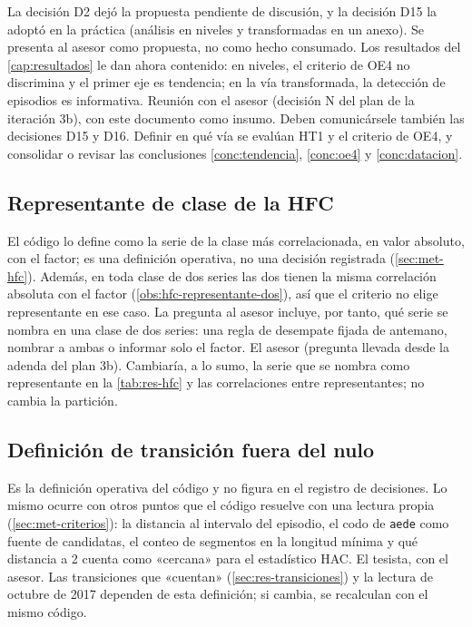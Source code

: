 {La decisión D2 dejó la propuesta pendiente de discusión, y la decisión D15 la adoptó en la
práctica (análisis en niveles y transformadas en un anexo). Se presenta al asesor como propuesta,
no como hecho consumado. Los resultados del \cref{cap:resultados} le dan ahora contenido: en niveles,
el criterio de OE4 no discrimina y el primer eje es tendencia; en la vía transformada, la detección
de episodios es informativa.}
{Reunión con el asesor (decisión N del plan de la iteración 3b), con este documento como insumo.
Deben comunicársele también las decisiones D15 y D16.}
{Definir en qué vía se evalúan HT1 y el criterio de OE4, y consolidar o revisar las conclusiones
\ref{conc:tendencia}, \ref{conc:oe4} y \ref{conc:datacion}.}

\subsection{Representante de clase de la HFC}
\label{sec:pend-representante}

{El código lo define como la serie de la clase más correlacionada, en valor absoluto, con el
factor; es una definición operativa, no una decisión registrada (\cref{sec:met-hfc}). Además,
en toda clase de dos series las dos tienen la misma correlación absoluta con el factor
(\cref{obs:hfc-representante-dos}), así que el criterio no elige representante en ese caso. La
pregunta al asesor incluye, por tanto, qué serie se nombra en una clase de dos series: una regla
de desempate fijada de antemano, nombrar a ambas o informar solo el factor.}
{El asesor (pregunta llevada desde la adenda del plan 3b).}
{Cambiaría, a lo sumo, la serie que se nombra como representante en la \cref{tab:res-hfc} y las
correlaciones entre representantes; no cambia la partición.}

\subsection{Definición de transición fuera del nulo}
\label{sec:pend-fuera-nulo}

{Es la definición operativa del código y no figura en el registro de decisiones. Lo mismo ocurre
con otros puntos que el código resuelve con una lectura propia (\cref{sec:met-criterios}): la
distancia al intervalo del episodio, el codo de \texttt{aede} como fuente de candidatas, el conteo
de segmentos en la longitud mínima y qué distancia a 2 cuenta como «cercana» para el estadístico
HAC.}
{El tesista, con el asesor.}
{Las transiciones que «cuentan» (\cref{sec:res-transiciones}) y la lectura de octubre de 2017
dependen de esta definición; si cambia, se recalculan con el mismo código.}

